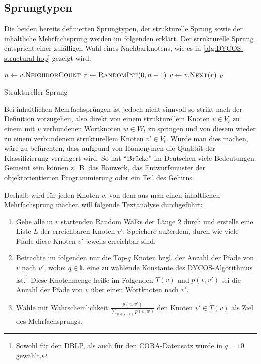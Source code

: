 \subsection{Sprungtypen}\label{sec:sprungtypen}
Die beiden bereits definierten Sprungtypen, der strukturelle Sprung
sowie der inhaltliche Mehrfachsprung werden im folgenden erklärt.
\goodbreak
Der strukturelle Sprung entspricht einer zufälligen Wahl eines 
Nachbarknotens, wie es in \cref{alg:DYCOS-structural-hop}
gezeigt wird.
\begin{algorithm}[H]
    \begin{algorithmic}[1]
            \State $n \gets v.\Call{NeighborCount}{}$ 
            \State $r \gets \Call{RandomInt}{0, n-1}$ 
            \State $v \gets v.\Call{Next}{r}$ 
            \State \Return $v$
        \EndProcedure
    \end{algorithmic}
\caption{Struktureller Sprung}
\label{alg:DYCOS-structural-hop}
\end{algorithm}

Bei inhaltlichen Mehrfachsprüngen ist jedoch nicht sinnvoll so strikt
nach der Definition vorzugehen,  also
direkt von einem strukturellem Knoten 
$v \in V_t$ zu einem mit $v$ verbundenen Wortknoten $w \in W_t$ zu springen
und von diesem wieder zu einem verbundenem strukturellem Knoten 
$v' \in V_t$. Würde man dies machen, wäre zu befürchten, dass
aufgrund von Homonymen die Qualität der Klassifizierung verringert
wird. So hat \enquote{Brücke} im Deutschen viele Bedeutungen.
Gemeint sein können z.~B. das Bauwerk, das Entwurfsmuster der
objektorientierten Programmierung oder ein Teil des Gehirns.

Deshalb wird für jeden Knoten $v$, von dem aus man einen inhaltlichen
Mehrfachsprung machen will folgende Textanalyse durchgeführt:
\begin{enumerate}[label=C\arabic*,ref=C\arabic*]
    \item \label{step:c1} Gehe alle in $v$ startenden Random Walks der Länge $2$ durch
          und erstelle eine Liste $L$ der erreichbaren Knoten $v'$. Speichere
          außerdem, durch wie viele Pfade diese Knoten $v'$ jeweils erreichbar sind.
    \item \label{step:c2} Betrachte im folgenden nur die Top-$q$ Knoten bzgl. der
          Anzahl der Pfade von $v$ nach $v'$, wobei $q \in \mathbb{N}$
          eine zu wählende Konstante des DYCOS-Algorithmus ist.\footnote{Sowohl für den DBLP, als auch für den 
CORA-Datensatz wurde in \cite[S. 364]{aggarwal2011} $q=10$ gewählt.}
          Diese Knotenmenge heiße im Folgenden $T(v)$ und $p(v, v')$
          sei die Anzahl der Pfade von $v$ über einen Wortknoten nach $v'$.
    \item \label{step:c3} Wähle mit Wahrscheinlichkeit $\frac{p(v, v')}{\sum_{w \in T(v)} p(v, w)}$
          den Knoten $v' \in T(v)$ als Ziel des Mehrfachsprungs.
\end{enumerate}

